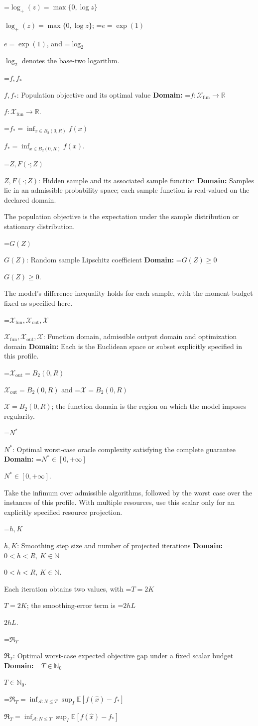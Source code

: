 \documentclass[10pt,a4paper]{article}
\newcommand{\AtlasMath}[1]{\par\begingroup\centering\setbox0=\hbox{$\displaystyle #1$}\ifdim\wd0>1.4\linewidth\typeout{ATLAS WIDE FORMULA: \the\wd0}\fi\ifdim\wd0>\linewidth\resizebox{\linewidth}{!}{\box0}\else\box0\fi\par\endgroup}
\newcommand{\AtlasInlineMath}[1]{\begingroup\setbox0=\hbox{$#1$}\ifdim\wd0>.4\linewidth\endgroup\AtlasMath{#1}\else\endgroup$#1$\fi}
\begin{document}
\AtlasInlineMath{\log_+(z)=\max\{0,\log z\}}; \AtlasInlineMath{e=\exp(1)}, and \AtlasInlineMath{\log_2} denotes the base-two logarithm.

\AtlasInlineMath{f,f_*}: Population objective and its optimal value \textbf{Domain:} \AtlasInlineMath{f:\mathcal{X}_{\mathrm{fun}}\to\mathbb{R}}.

\AtlasInlineMath{f_*=\inf_{x\in B_2(0,R)}f(x)}.

\AtlasInlineMath{Z,F(\cdot;Z)}: Hidden sample and its associated sample function \textbf{Domain:} Samples lie in an admissible probability space; each sample function is real-valued on the declared domain.

The population objective is the expectation under the sample distribution or stationary distribution.

\AtlasInlineMath{G(Z)}: Random sample Lipschitz coefficient \textbf{Domain:} \AtlasInlineMath{G(Z)\ge0}.

The model's difference inequality holds for each sample, with the moment budget fixed as specified here.

\AtlasInlineMath{\mathcal{X}_{\mathrm{fun}},\mathcal{X}_{\mathrm{out}},\mathcal{X}}: Function domain, admissible output domain and optimization domain \textbf{Domain:} Each is the Euclidean space or subset explicitly specified in this profile.

\AtlasInlineMath{\mathcal{X}_{\mathrm{out}}=B_2(0,R)} and \AtlasInlineMath{\mathcal{X}=B_2(0,R)}; the function domain is the region on which the model imposes regularity.

\AtlasInlineMath{N^*}: Optimal worst-case oracle complexity satisfying the complete guarantee \textbf{Domain:} \AtlasInlineMath{N^*\in[0,+\infty]}.

Take the infimum over admissible algorithms, followed by the worst case over the instances of this profile. With multiple resources, use this scalar only for an explicitly specified resource projection.

\AtlasInlineMath{h,K}: Smoothing step size and number of projected iterations \textbf{Domain:} \AtlasInlineMath{0<h<R,\ K\in\mathbb{N}}.

Each iteration obtains two values, with \AtlasInlineMath{T=2K}; the smoothing-error term is \AtlasInlineMath{2hL}.

\AtlasInlineMath{\mathfrak R_T}: Optimal worst-case expected objective gap under a fixed scalar budget \textbf{Domain:} \AtlasInlineMath{T\in\mathbb{N}_0}.

\AtlasInlineMath{\mathfrak R_T=\inf_{\mathcal{A}:N\le T}\sup_I\mathbb{E}[f(\widehat{x})-f_*]}
\end{document}
